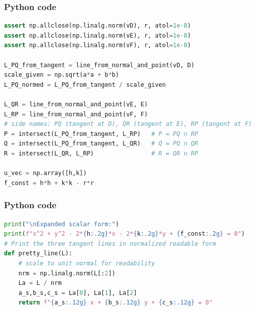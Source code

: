 \documentclass{beamer}
\begin{document}
\begin{frame}[fragile]
    \frametitle{Python code}
    \begin{lstlisting}[language=Python]
assert np.allclose(np.linalg.norm(vD), r, atol=1e-8)
assert np.allclose(np.linalg.norm(vE), r, atol=1e-8)
assert np.allclose(np.linalg.norm(vF), r, atol=1e-8)

L_PQ_from_tangent = line_from_normal_and_point(vD, D)
scale_given = np.sqrt(a*a + b*b)
L_PQ_normed = L_PQ_from_tangent / scale_given

L_QR = line_from_normal_and_point(vE, E)
L_RP = line_from_normal_and_point(vF, F)
# side names: PQ (tangent at D), QR (tangent at E), RP (tangent at F)
P = intersect(L_PQ_from_tangent, L_RP)   # P = PQ ∩ RP
Q = intersect(L_PQ_from_tangent, L_QR)   # Q = PQ ∩ QR
R = intersect(L_QR, L_RP)                # R = QR ∩ RP

u_vec = np.array([h,k])
f_const = h*h + k*k - r*r

    \end{lstlisting}   
\end{frame}

\begin{frame}[fragile]
    \frametitle{Python code}
    \begin{lstlisting}[language=Python]
print("\nExpanded scalar form:")
print(f"x^2 + y^2 - 2*{h:.2g}*x - 2*{k:.2g}*y + {f_const:.2g} = 0")
# Print the three tangent lines in normalized readable form
def pretty_line(L):
    # scale to unit normal for readability
    nrm = np.linalg.norm(L[:2])
    La = L / nrm
    a_s,b_s,c_s = La[0], La[1], La[2]
    return f"{a_s:.12g} x + {b_s:.12g} y + {c_s:.12g} = 0"
    \end{lstlisting}   
\end{frame}
\end{document}

